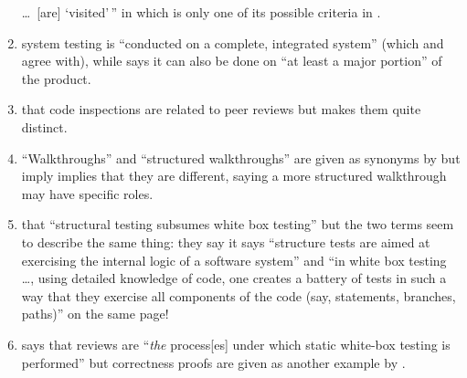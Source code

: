 \begin{enumerate}
          \dots\ [are] `visited'\,'' in \citep[p.~19]{IEEE2021} which
          is only one of its possible criteria in \citep[pp.~82-83]{Patton2006}.
    \item %
           \citet[p.~456]{IEEE2017}  system
          testing is ``conducted on a complete, integrated system'' (which
          \citet[Tab.~12.3]{PetersAndPedrycz2000} and
          \citet[p.~439]{vanVliet2000} agree with), while
          \citet[p.~109]{Patton2006} says it can also be done on ``at least a
          major portion'' of the product.
    \item %
           \citetISTQB{}  that code inspections
          are related to peer reviews but \citet[pp.~94--95]{Patton2006} makes
          them quite distinct.
    \item %
          ``Walkthroughs'' and ``structured walkthroughs'' are given
          as synonyms by \citetISTQB{} but \citet[p.~484]{PetersAndPedrycz2000}
          \ifnotpaper imply \else implies \fi that they are different, saying a
          more structured walkthrough may have specific roles.
    \item %
           \citet[p.~447]{PetersAndPedrycz2000}
           that ``structural testing subsumes white box
          testing'' but the two terms seem to describe the same thing:
          \ifnotpaper they say \else it says \fi ``structure tests are aimed at
          exercising the internal logic of a software system'' and ``in white box
          testing \dots, using detailed knowledge of code, one creates a battery of
          tests in such a way that they exercise all components of the code
          (say, statements, branches, paths)'' on the same page!
    \item %
           \citet[p.~92\ifnotpaper, emphasis added\fi]{Patton2006}
          says that reviews are ``\emph{the} process[es] under which static
          white-box testing is performed'' but correctness proofs are given
          as another example by \citet[pp.~418--419]{vanVliet2000}.


\end{enumerate}
